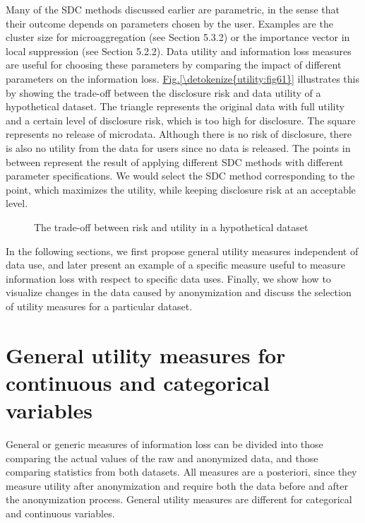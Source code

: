 \documentclass[letterpaper,10pt,english]{sphinxmanual}
\begin{document}
Many of the SDC methods discussed earlier are parametric, in the sense
that their outcome depends on parameters chosen by the user. Examples
are the cluster size for microaggregation (see Section 5.3.2) or the
importance vector in local suppression (see Section 5.2.2). Data utility
and information loss measures are useful for choosing these parameters
by comparing the impact of different parameters on the information loss.
\hyperref[\detokenize{utility:fig61}]{Fig.\@ \ref{\detokenize{utility:fig61}}} illustrates this by showing the trade-off between the
disclosure risk and data utility of a hypothetical dataset. The triangle
represents the original data with full utility and a certain level of
disclosure risk, which is too high for disclosure. The square represents
no release of microdata. Although there is no risk of disclosure, there
is also no utility from the data for users since no data is released.
The points in between represent the result of applying different SDC
methods with different parameter specifications. We would select the SDC
method corresponding to the point, which maximizes the utility, while
keeping disclosure risk at an acceptable level.

\begin{figure}[htbp]
\centering
\capstart

\noindent{}
\caption{The trade-off between risk and utility in a hypothetical dataset}\label{\detokenize{utility:fig61}}\label{\detokenize{utility:id3}}\end{figure}

In the following sections, we first propose general utility measures
independent of data use, and later present an example of a specific
measure useful to measure information loss with respect to specific data
uses. Finally, we show how to visualize changes in the data caused by
anonymization and discuss the selection of utility measures for a
particular dataset.


\section{General utility measures for continuous and categorical variables}
\label{\detokenize{utility:general-utility-measures-for-continuous-and-categorical-variables}}
General or generic measures of information loss can be divided into
those comparing the actual values of the raw and anonymized data, and
those comparing statistics from both datasets. All measures are a
posteriori, since they measure utility after anonymization and require
both the data before and after the anonymization process. General
utility measures are different for categorical and continuous variables.
\end{document}
